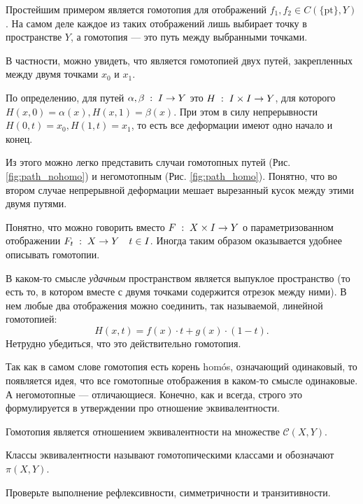 \begin{Ex}
    Простейшим примером является гомотопия для отображений $f_1, f_2 \in C(\{\mathrm{pt}\}, Y)$. На самом деле каждое из таких отображений лишь выбирает точку в пространстве $Y$, а гомотопия --- это путь между выбранными точками. 
\end{Ex}

 \begin{Note}
     В частности, можно увидеть, что является гомотопией двух путей, закрепленных между двумя точками $x_0$ и $x_1$. 

    По определению, для путей $\alpha, \beta \; : \; I \to Y$ это $H\; : \; I \times I \to Y$, для которого $H(x, 0) = \alpha(x), H(x,1) = \beta(x)$. При этом в силу непрерывности $H(0, t) = x_0, H(1, t) = x_1$, то есть все деформации имеют одно начало и конец.

    Из этого можно легко представить случаи гомотопных путей (Рис. \ref{fig:path_nohomo}) и негомотопным (Рис. \ref{fig:path_homo}). Понятно, что во втором случае непрерывной деформации мешает вырезанный кусок между этими двумя путями. 
\end{Note}

Понятно, что можно говорить вместо $F\; : \; X\times I \to Y$ о параметризованном отображении $F_t \; : \; X \to Y \quad t \in I$. Иногда таким образом оказывается удобнее описывать гомотопии.

\begin{Ex}
    В каком-то смысле \textit{удачным} пространством является выпуклое пространство (то есть то, в котором вместе с двумя точками содержится отрезок между ними). В нем любые два отображения можно соединить, так называемой, линейной гомотопией:
    \[
    H(x,t) = f(x) \cdot t + g(x) \cdot (1-t).
    \] 
    Нетрудно убедиться, что это действительно гомотопия.
\end{Ex}
    
Так как в самом слове гомотопия есть корень homós, означающий одинаковый, то появляется идея, что все гомотопные отображения в каком-то смысле одинаковые. А негомотопные --- отличающиеся. Конечно, как и всегда, строго это формулируется в утверждении про отношение эквивалентности.
 
\begin{Prop}
    Гомотопия является отношением эквивалентности на множестве $\mathcal{C}(X,Y)$. 

    Классы эквивалентности называют гомотопическими классами и обозначают $\pi(X,Y)$.
\end{Prop}
\begin{Task}
    Проверьте выполнение рефлексивности, симметричности и транзитивности.
\end{Task}

